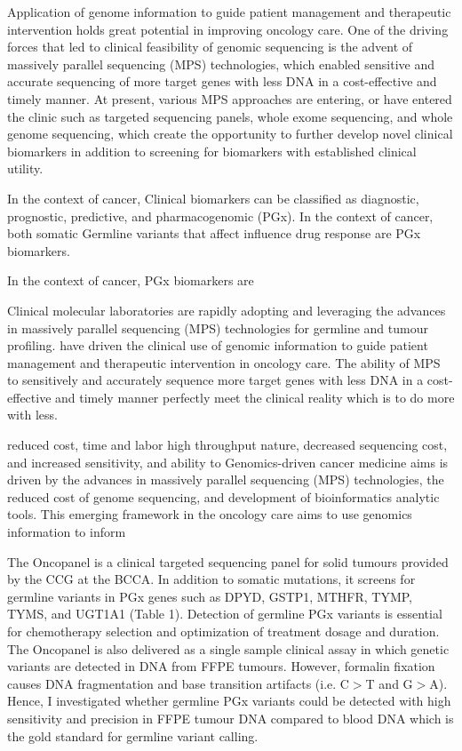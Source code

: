 Application of genome information to guide patient management and therapeutic intervention holds great potential in improving oncology care. One of the driving forces that led to clinical feasibility of genomic sequencing is the advent of massively parallel sequencing (MPS) technologies, which enabled sensitive and accurate sequencing of more target genes with less DNA in a cost-effective and timely manner. At present, various MPS approaches are entering, or have entered the clinic such as targeted sequencing panels, whole exome sequencing, and whole genome sequencing, which create the opportunity to further develop novel clinical biomarkers in addition to screening for biomarkers with established clinical utility.

In the context of cancer,
Clinical biomarkers can be classified as diagnostic, prognostic, predictive, and pharmacogenomic (PGx). In the context of cancer, both somatic Germline variants that affect influence drug response are PGx biomarkers.

In the context of cancer, PGx biomarkers are

Clinical molecular laboratories are rapidly adopting and leveraging the advances in massively parallel sequencing (MPS) technologies for germline and tumour profiling. have driven the clinical use of genomic information to guide patient management and therapeutic intervention in oncology care. The ability of MPS to sensitively and accurately sequence more target genes with less DNA in a cost-effective and timely manner perfectly meet the clinical reality which is to do more with less.

reduced cost, time and labor high throughput nature, decreased sequencing cost, and increased sensitivity, and ability to Genomics-driven cancer medicine aims is driven by the advances in massively parallel sequencing (MPS) technologies, the reduced cost of genome sequencing, and development of bioinformatics analytic tools. This emerging framework in the oncology care aims to use genomics information to inform

The Oncopanel is a clinical targeted sequencing panel for solid tumours provided by the CCG at the BCCA. In addition to somatic mutations, it screens for germline variants in PGx genes such as DPYD, GSTP1, MTHFR, TYMP, TYMS, and UGT1A1 (Table 1). Detection of germline PGx variants is essential for chemotherapy selection and optimization of treatment dosage and duration. The Oncopanel is also delivered as a single sample clinical assay in which genetic variants are detected in DNA from FFPE tumours. However, formalin fixation causes DNA fragmentation and base transition artifacts (i.e. C$>$T and G$>$A). Hence, I investigated whether germline PGx variants could be detected with high sensitivity and precision in FFPE tumour DNA compared to blood DNA which is the gold standard for germline variant calling.
